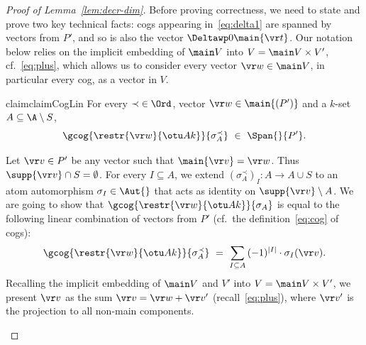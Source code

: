 \begin{proof}[Proof of Lemma~\ref{lem:decr-dim}]
Before proving correctness, %
we need to state and prove two key technical facts: cogs
appearing in~\eqref{eq:delta1} are spanned by vectors from $P'$,
and so is also the vector $\Deltawp 0 \main{\vr t}$.
Our notation below relies on the implicit embedding of $\main V$ into $V = \main V \times V'$,
cf.~\eqref{eq:plus}, which allows us to consider
every vector $\vr w\in \main V$, in particular every cog, as a vector in $V$.
%
\begin{restatable}{claim}{claimCogLin}
\label{claim:coglin}
For every $\prec \; \in \Ord$, vector $\vr w \in \main {(P')}$ %
and a $k$-set $A \subseteq \A\setminus S$, 
\[ 
\gcog {\restr{\vr w} {\otu A k}} {\sigma^\prec_A} \ \in \ \Span {} {P'}.
\]
\end{restatable}
%
\begin{claimproof}
Let $\vr v\in P'$ be any vector such that $\main{\vr v} =  \vr w$.
Thus $\supp{\vr v} \cap S = \emptyset$.
For every $I\subseteq A$, we extend  $(\sigma^\prec_A)_I: A\to A\cup S$ to an 
atom automorphism $\sigma_I\in\Aut{}$ 
that acts as identity on $\supp{\vr v} \setminus A$.
We are going to show that $\gcog {\restr{\vr w} {\otu A k}} {\sigma_A}$ is equal to the following linear combination of vectors from $P'$
(cf.~the definition~\eqref{eq:cog} of cogs):
\begin{align} \label{eq:tbs}
\gcog {\restr{\vr w} {\otu A k}} {\sigma^\prec_A} \ = \ \sum_{I\subseteq A}\, (-1)^{|I|} \cdot \sigma_I (\vr v).
\end{align}
Recalling the implicit embedding of $\main V$ and $V'$ into $V = \main V \times V'$,
we present $\vr v$ as the sum $\vr v = \vr w + \vr v'$
(recall~\eqref{eq:plus}), where  $\vr v'$ is  the projection to all non-main components.

\end{claimproof}
\end{proof}
